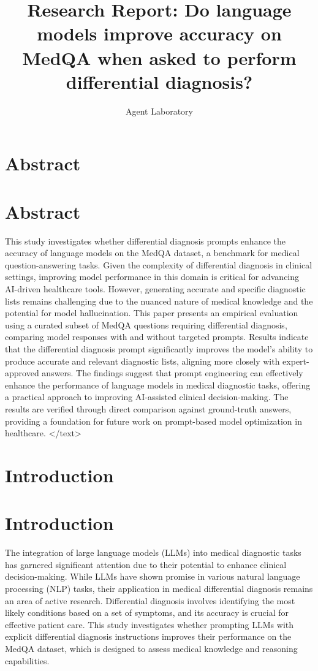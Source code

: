 \documentclass{article}
\title{Research Report: Do language models improve accuracy on MedQA when asked to perform differential diagnosis?}
\author{Agent Laboratory}
\begin{document}
\maketitle
\section{Abstract}
\section*{Abstract}
This study investigates whether differential diagnosis prompts enhance the accuracy of language models on the MedQA dataset, a benchmark for medical question-answering tasks. Given the complexity of differential diagnosis in clinical settings, improving model performance in this domain is critical for advancing AI-driven healthcare tools. However, generating accurate and specific diagnostic lists remains challenging due to the nuanced nature of medical knowledge and the potential for model hallucination. This paper presents an empirical evaluation using a curated subset of MedQA questions requiring differential diagnosis, comparing model responses with and without targeted prompts. Results indicate that the differential diagnosis prompt significantly improves the model's ability to produce accurate and relevant diagnostic lists, aligning more closely with expert-approved answers. The findings suggest that prompt engineering can effectively enhance the performance of language models in medical diagnostic tasks, offering a practical approach to improving AI-assisted clinical decision-making. The results are verified through direct comparison against ground-truth answers, providing a foundation for future work on prompt-based model optimization in healthcare.
</text>
\section{Introduction}
\section{Introduction}

The integration of large language models (LLMs) into medical diagnostic tasks has garnered significant attention due to their potential to enhance clinical decision-making. While LLMs have shown promise in various natural language processing (NLP) tasks, their application in medical differential diagnosis remains an area of active research. Differential diagnosis involves identifying the most likely conditions based on a set of symptoms, and its accuracy is crucial for effective patient care. This study investigates whether prompting LLMs with explicit differential diagnosis instructions improves their performance on the MedQA dataset, which is designed to assess medical knowledge and reasoning capabilities.
\end{document}

